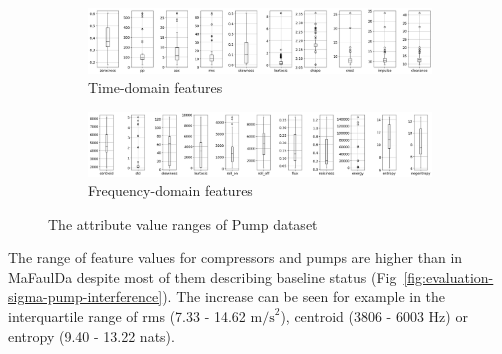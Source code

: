 \begin{figure}[h]
    \centering
    \begin{subfigure}[b]{\textwidth}
        \includegraphics[width=\textwidth]{assets/results/feature-values/pumps-TD-dim-3.png}
        \caption{Time-domain features}
    \end{subfigure}
    \hfill
    \begin{subfigure}[b]{\textwidth}
        \includegraphics[width=\textwidth]{assets/results/feature-values/pumps-FD-dim-3.png}
        \caption{Frequency-domain features}
    \end{subfigure}
    \caption{The attribute value ranges of Pump dataset}
\end{figure}

The range of feature values for compressors and pumps are higher than in MaFaulDa despite most of them describing baseline status (Fig~\ref{fig:evaluation-sigma-pump-interference}). The increase can be seen for example in the interquartile range of rms (7.33 - 14.62 $\mathrm{m/s}^2$), centroid (3806 - 6003 Hz) or entropy (9.40 - 13.22 nats).